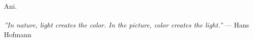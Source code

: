 \thispagestyle{empty}\mbox{}{\textheight}\mbox{}\hfill\begin{minipage}{0.55\textwidth}%

Ani.\\\\
\textit{''In nature, light creates the color. In the picture, color creates the light.''}
\flushright --- Hans Hofmann
\normalfont\end{minipage}
